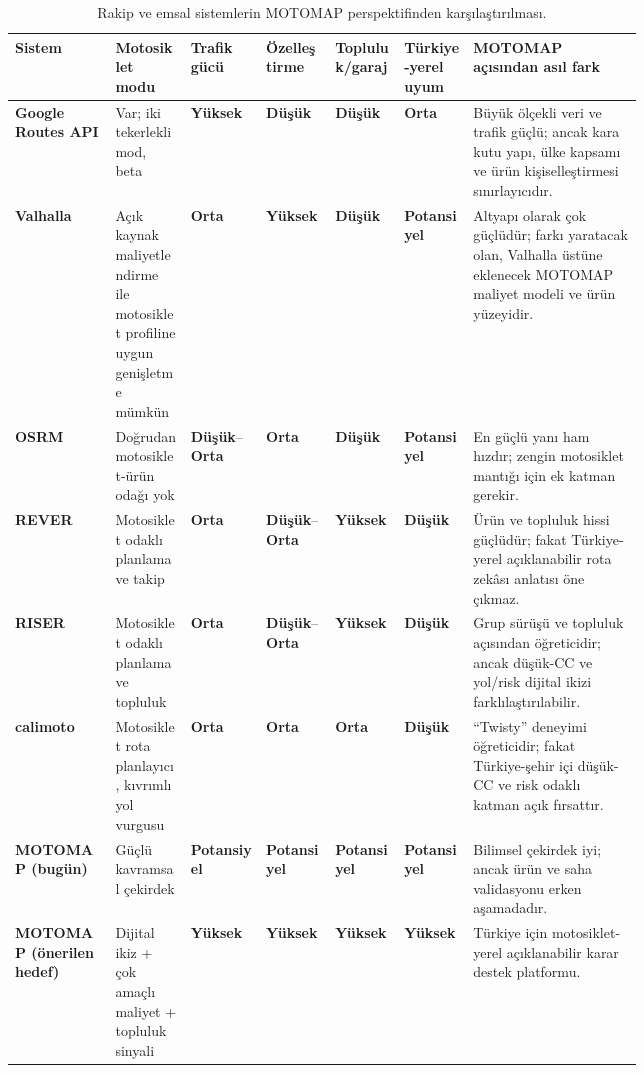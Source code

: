 \documentclass[11pt,a4paper]{article}
\newcommand{\good}{\textbf{Yüksek}}
\newcommand{\midv}{\textbf{Orta}}
\newcommand{\lowv}{\textbf{Düşük}}
\newcommand{\pot}{\textbf{Potansiyel}}
\begin{document}
\begin{table}[htbp]
\centering
\scriptsize
{}
\begin{tabularx}{\linewidth}{>{\bfseries}p{0.16\linewidth}p{0.12\linewidth}p{0.12\linewidth}p{0.11\linewidth}p{0.11\linewidth}p{0.11\linewidth}Y}
\toprule
Sistem & Motosiklet modu & Trafik gücü & Özelleştirme & Topluluk/garaj & Türkiye-yerel uyum & MOTOMAP açısından asıl fark \\
\midrule
Google Routes API & Var; iki tekerlekli mod, beta \cite{o1,o2} & \good & \lowv & \lowv & \midv & Büyük ölçekli veri ve trafik güçlü; ancak kara kutu yapı, ülke kapsamı ve ürün kişiselleştirmesi sınırlayıcıdır. \\
Valhalla & Açık kaynak maliyetlendirme ile motosiklet profiline uygun genişletme mümkün \cite{o7,o8,o13} & \midv & \good & \lowv & \pot & Altyapı olarak çok güçlüdür; farkı yaratacak olan, Valhalla üstüne eklenecek MOTOMAP maliyet modeli ve ürün yüzeyidir. \\
OSRM & Doğrudan motosiklet-ürün odağı yok \cite{o14} & \lowv--\midv & \midv & \lowv & \pot & En güçlü yanı ham hızdır; zengin motosiklet mantığı için ek katman gerekir. \\
REVER & Motosiklet odaklı planlama ve takip \cite{o15} & \midv & \lowv--\midv & \good & \lowv & Ürün ve topluluk hissi güçlüdür; fakat Türkiye-yerel açıklanabilir rota zekâsı anlatısı öne çıkmaz. \\
RISER & Motosiklet odaklı planlama ve topluluk \cite{o16} & \midv & \lowv--\midv & \good & \lowv & Grup sürüşü ve topluluk açısından öğreticidir; ancak düşük-CC ve yol/risk dijital ikizi farklılaştırılabilir. \\
calimoto & Motosiklet rota planlayıcı, kıvrımlı yol vurgusu \cite{o17} & \midv & \midv & \midv & \lowv & ``Twisty'' deneyimi öğreticidir; fakat Türkiye-şehir içi düşük-CC ve risk odaklı katman açık fırsattır. \\
MOTOMAP (bugün) & Güçlü kavramsal çekirdek \cite{u1,u2,g1} & \pot & \pot & \pot & \pot & Bilimsel çekirdek iyi; ancak ürün ve saha validasyonu erken aşamadadır. \\
MOTOMAP (önerilen hedef) & Dijital ikiz + çok amaçlı maliyet + topluluk sinyali & \good & \good & \good & \good & Türkiye için motosiklet-yerel açıklanabilir karar destek platformu. \\
\bottomrule
\end{tabularx}
\caption{Rakip ve emsal sistemlerin MOTOMAP perspektifinden karşılaştırılması.}
\end{table}
\end{document}
